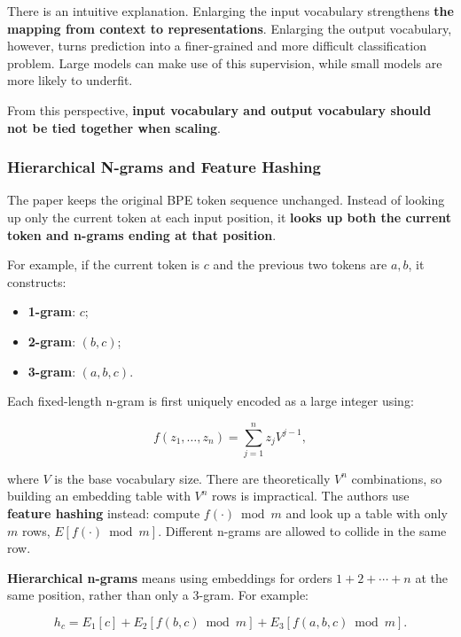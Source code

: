 \documentclass[
  11pt,
  a4paper,
]{article}
\providecommand{\tightlist}{%
  \setlength{\itemsep}{0pt}\setlength{\parskip}{0pt}}
\newenvironment{NotesFormula}{%
  \par\noindent\begin{minipage}{\linewidth}%
  \setlength{\parindent}{2em}%
  \setlength{\parskip}{0.35em}%
}{\end{minipage}\par}
\begin{document}
There is an intuitive explanation. Enlarging the input vocabulary
strengthens \textbf{the mapping from context to representations}.
Enlarging the output vocabulary, however, turns prediction into a
finer-grained and more difficult classification problem. Large models
can make use of this supervision, while small models are more likely to
underfit.

From this perspective, \textbf{input vocabulary and output vocabulary
should not be tied together when scaling}.

\subsubsection{Hierarchical N-grams and Feature
Hashing}\label{hierarchical-n-grams-and-feature-hashing}

The paper keeps the original BPE token sequence unchanged. Instead of
looking up only the current token at each input position, it
\textbf{looks up both the current token and n-grams ending at that
position}.

For example, if the current token is \(c\) and the previous two tokens
are \(a,b\), it constructs:

\begin{itemize}
\tightlist
\item
  \textbf{1-gram}: \(c\);
\item
  \textbf{2-gram}: \((b,c)\);
\item
  \textbf{3-gram}: \((a,b,c)\).
\end{itemize}

\begin{NotesFormula}

Each fixed-length n-gram is first uniquely encoded as a large integer
using:

\[
f(z_1,\ldots,z_n)=\sum_{j=1}^{n}z_j V^{j-1},
\]

\end{NotesFormula}

where \(V\) is the base vocabulary size. There are theoretically \(V^n\)
combinations, so building an embedding table with \(V^n\) rows is
impractical. The authors use \textbf{feature hashing} instead: compute
\(f(\cdot)\bmod m\) and look up a table with only \(m\) rows,
\(E[f(\cdot)\bmod m]\). Different n-grams are allowed to collide in the
same row.

\begin{NotesFormula}

\textbf{Hierarchical n-grams} means using embeddings for orders
\(1+2+\cdots+n\) at the same position, rather than only a 3-gram. For
example:

\[
h_c=E_1[c]+E_2\!\left[f(b,c)\bmod m\right]
+E_3\!\left[f(a,b,c)\bmod m\right].
\]

\end{NotesFormula}
\end{document}
